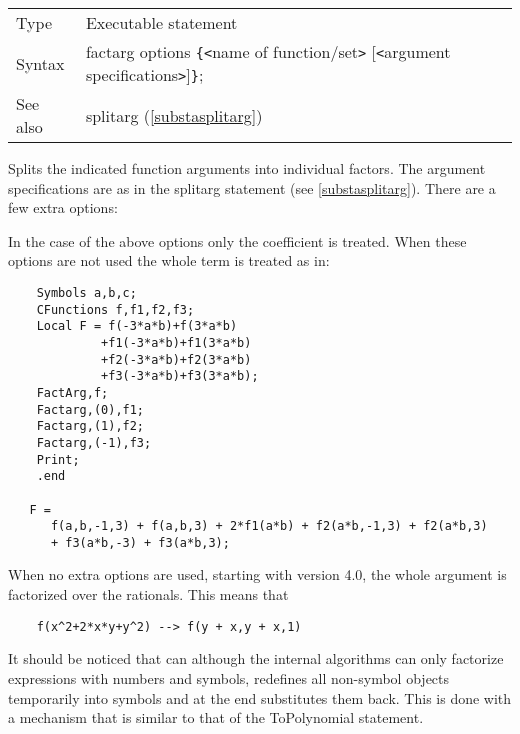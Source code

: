 \noindent \begin{tabular}{ll}
Type & Executable statement\\
Syntax & factarg options \verb:{:{\tt<}name of function/set{\tt>}
                [{\tt<}argument specifications{\tt>}]\verb:}:;
\\ See also & splitarg (\ref{substasplitarg})
\end{tabular} \vspace{4mm}

\noindent Splits the indicated function arguments into individual factors. The argument specifications 
are as in the splitarg statement (see 
\ref{substasplitarg}). There are a few extra options:




\noindent In the case of the above options only the coefficient is treated. 
When these options are not used the whole term is treated as in:
\begin{verbatim}
    Symbols a,b,c;
    CFunctions f,f1,f2,f3;
    Local F = f(-3*a*b)+f(3*a*b)
             +f1(-3*a*b)+f1(3*a*b)
             +f2(-3*a*b)+f2(3*a*b)
             +f3(-3*a*b)+f3(3*a*b);
    FactArg,f;
    Factarg,(0),f1;
    Factarg,(1),f2;
    Factarg,(-1),f3;
    Print;
    .end

   F =
      f(a,b,-1,3) + f(a,b,3) + 2*f1(a*b) + f2(a*b,-1,3) + f2(a*b,3)
      + f3(a*b,-3) + f3(a*b,3);
\end{verbatim}
When no extra options are used, starting with version 4.0, the whole 
argument is factorized over the rationals. This means that
\begin{verbatim}
    f(x^2+2*x*y+y^2) --> f(y + x,y + x,1)
\end{verbatim}
It should be noticed that \FORM{} can although the internal algorithms can
only factorize expressions with numbers and symbols, \FORM{} redefines all
non-symbol objects temporarily into symbols and at the end substitutes them 
back. This is done with a mechanism that is similar to that of the 
ToPolynomial statement.

